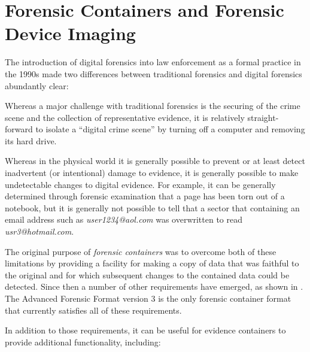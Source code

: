 \chapter{Forensic Containers and Forensic Device Imaging}
The introduction of digital forensics into law enforcement as a formal
practice in the 1990s made two differences between traditional
forensics and digital forensics abundantly clear:
\begin{compactenum}
\item Whereas a major challenge with traditional forensics is the
  securing of the crime scene and the collection of representative
  evidence, it is relatively straight-forward to isolate a ``digital
  crime scene'' by turning off a computer and removing its hard
  drive. 
\item Whereas in the physical world it is generally possible to
  prevent or at least detect inadvertent (or intentional) damage to
  evidence, it is generally possible to make undetectable
  changes to digital evidence.  For example, it can be generally determined through
  forensic examination that a page has been torn out of a notebook,
  but it is generally not possible to tell that a sector that
  containing an email  address such as \emph{user1234@aol.com} was
  overwritten to read \emph{usr3@hotmail.com}.
\end{compactenum}

The original purpose of \emph{forensic containers} was to overcome
both of these limitations by providing a facility for making a copy of
data that was faithful to the original and for which 
subsequent changes to the contained data could be detected. Since then
a number of other requirements have emerged, as shown in
. The Advanced Forensic Format version
3\cite{garfinkel:aff} is the only forensic container format that
currently satisfies all of these requirements.

In addition to those requirements, it
can be useful for evidence containers to provide additional
functionality, including:

